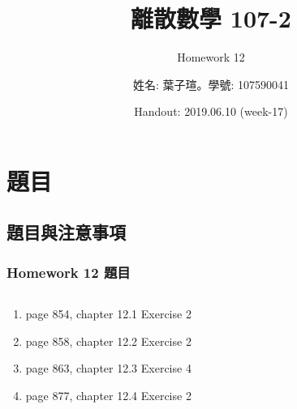 \documentclass[12pt,hyperref={bookmarks=false}]{beamer}
\title{離散數學 107-2}
\subtitle{Homework 12}
\author{姓名: 葉子瑄。學號: 107590041}
\date{Handout: 2019.06.10 (week-17)}
\begin{document}

\begin{frame}
\titlepage
\end{frame}

\raggedright

\begin{frame}
\footnotesize
\tableofcontents
\end{frame}
	
\section{題目}

	\subsection{題目與注意事項}
	
	\begin{frame}
	\frametitle{Homework 12 題目}
	\fontsize{10pt}{11pt}\selectfont
	\setlength{\baselineskip}{5pt}
	\begin{columns}
	\begin{column}{0.68\textwidth}
	\begin{enumerate}[label=(Prob. \arabic*)]
	\setlength\itemsep{0em}
	\item page 854, chapter 12.1 Exercise 2
	\item page 858, chapter 12.2 Exercise 2
	\item page 863, chapter 12.3 Exercise 4
	\item page 877, chapter 12.4 Exercise 2
	\end{enumerate}
	\end{column}
	
	
	\end{columns}
	\end{frame}
	
\end{document}
